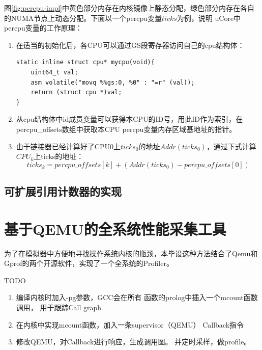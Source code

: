  图\ref{fig:percpu-impl}中黄色部分内存在内核镜像上静态分配，绿色部分内存在各自的NUMA节点上动态分配。下面以一个percpu变量$ticks$为例，说明
uCore中percpu变量的工作原理：
\begin{enumerate}
\item 
在适当的初始化后，各CPU可以通过GS段寄存器访问自己的cpu结构体：
\begin{lstlisting}
static inline struct cpu* mycpu(void){
	uint64_t val;                                  
	asm volatile("movq %%gs:0, %0" : "=r" (val));
	return (struct cpu *)val;                                               
} 
\end{lstlisting}

\item
从cpu结构体中id成员变量可以获得本CPU的ID号，用此ID作为索引，在percpu\_offsets数组中获取本CPU percpu变量内存区域基地址的指针。

\item 由于链接器已经计算好了CPU0上$ticks_0$的地址$Addr(ticks_0)$，通过下式计算$CPU_k$上ticks的地址：
\begin{equation}
\label{eq:percpu}
ticks_k = percpu\_offsets[k] + ( Addr(ticks_0) - percpu\_offsets[0] )
\end{equation}

\end{enumerate}


\subsection{可扩展引用计数器的实现}
\label{subsec:refcache}

\section{基于QEMU的全系统性能采集工具}
为了在模拟器中方便地寻找操作系统内核的瓶颈，本毕设这种方法结合了Qemu和Gprof的两个开源软件，实现了一个全系统的Profiler。

TODO

	\begin{enumerate}
		\item 编译内核时加入-pg参数，GCC会在所有
			函数的prolog中插入一个mcount函数调用，
			用于跟踪Call graph
		\item 在内核中实现mcount函数，加入一条supervisor（QEMU）
			Callback指令
		\item 修改QEMU，对Callback进行响应，生成调用图。
			并定时采样，做profile。
	\end{enumerate}

